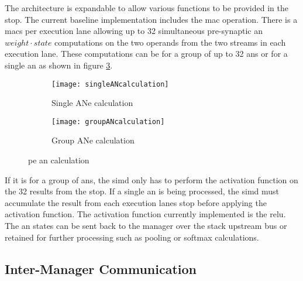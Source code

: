The architecture is expandable to allow various functions to be provided in the \ac{stop}.
The current baseline implementation includes the \ac{mac} operation.
There is a \acp{mac} per execution lane allowing up to 32 simultaneous pre-synaptic \ac{an} $weight \cdot state$ computations on the two operands from the two streams in each execution lane.
These computations can be for a group of up to 32 \acp{an} or for a single \ac{an} as shown in figure \ref{fig:PE AN calculation}.

\begin{figure}
\centering
  \begin{subfigure}{.49\textwidth}
    \centering
    \texttt{[image: singleANcalculation]}
    \captionsetup{justification=centering, skip=10pt}
    \caption{Single ANe calculation}
    \label{fig:Single AN calculation}
  \end{subfigure}%
  \begin{subfigure}{.49\textwidth}
    \centering
    \texttt{[image: groupANcalculation]}
    \captionsetup{justification=centering, skip=10pt}
    \caption{Group ANe calculation}
    \label{fig:Group AN calculation}
  \end{subfigure}%
\captionsetup{justification=centering, skip=16pt}
\caption{\ac{pe} \ac{an} calculation}
\label{fig:PE AN calculation}
\end{figure}

If it is for a group of \acp{an}, the \ac{simd} only has to perform the activation function on the 32 results from the \ac{stop}. 
If a single \ac{an} is being processed, the \ac{simd} must accumulate the result from each execution lanes \ac{stop} before applying the activation function.
The activation function currently implemented is the \ac{relu}.
The \ac{an} states can be sent back to the manager over the stack upstream bus or retained for further processing such as pooling or softmax calculations.

\subsection{Inter-Manager Communication}
\label{sec:Inter-Manager Communication}

